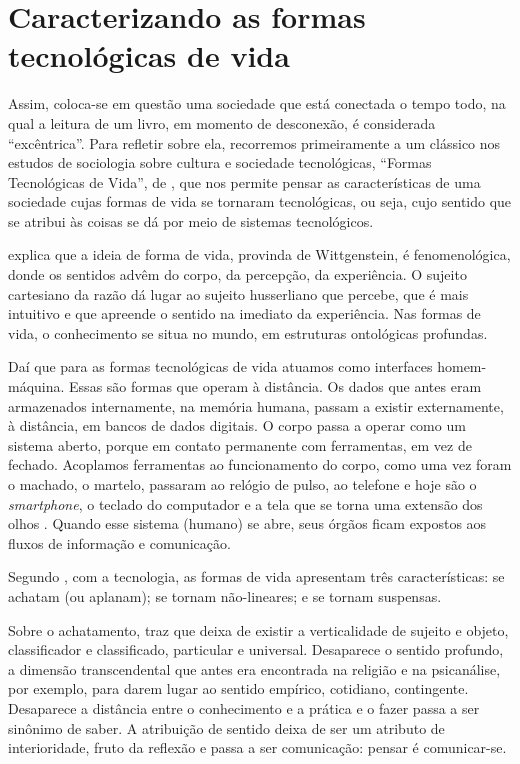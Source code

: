 \section{Caracterizando as formas tecnológicas de vida}\label{sec-caracterizandoasformastecnologicasdevida}

Assim, coloca-se em questão uma sociedade que está conectada o tempo todo, na qual a leitura de um livro, em momento de desconexão, é considerada \enquote{excêntrica}. Para refletir sobre ela, recorremos primeiramente a um clássico nos estudos de sociologia sobre cultura e sociedade tecnológicas, \enquote{Formas Tecnológicas de Vida}, de \textcite{lash2012}, que nos permite pensar as características de uma sociedade cujas formas de vida se tornaram tecnológicas, ou seja, cujo sentido que se atribui às coisas se dá por meio de sistemas tecnológicos. 

\textcite{lash2012} explica que a ideia de forma de vida, provinda de Wittgenstein, é fenomenológica, donde os sentidos advêm do corpo, da percepção, da experiência. O sujeito cartesiano da razão dá lugar ao sujeito husserliano que percebe, que é mais intuitivo e que apreende o sentido na imediato da experiência. Nas formas de vida, o conhecimento se situa no mundo, em estruturas ontológicas profundas.

Daí que para as formas tecnológicas de vida atuamos como interfaces homem-máquina. Essas são formas que operam à distância. Os dados que antes eram armazenados internamente, na memória humana, passam a existir externamente, à distância, em bancos de dados digitais. O corpo passa a operar como um sistema aberto, porque em contato permanente com ferramentas, em vez de fechado. Acoplamos ferramentas ao funcionamento do corpo, como uma vez foram o machado, o martelo, passaram ao relógio de pulso, ao telefone e hoje são o \textit{smartphone}, o teclado do computador e a tela que se torna uma extensão dos olhos \cite{pang2013}. Quando esse sistema (humano) se abre, seus órgãos ficam expostos aos fluxos de informação e comunicação. 

Segundo \textcite{lash2012}, com a tecnologia, as formas de vida apresentam três características: se achatam (ou aplanam); se tornam não-lineares; e se tornam suspensas.

Sobre o achatamento, \textcite{lash2012} traz que deixa de existir a verticalidade de sujeito e objeto, classificador e classificado, particular e universal. Desaparece o sentido profundo, a dimensão transcendental que antes era encontrada na religião e na psicanálise, por exemplo, para darem lugar ao sentido empírico, cotidiano, contingente. Desaparece a distância entre o conhecimento e a prática e o fazer passa a ser sinônimo de saber. A atribuição de sentido deixa de ser um atributo de interioridade, fruto da reflexão e passa a ser comunicação: pensar é comunicar-se.


